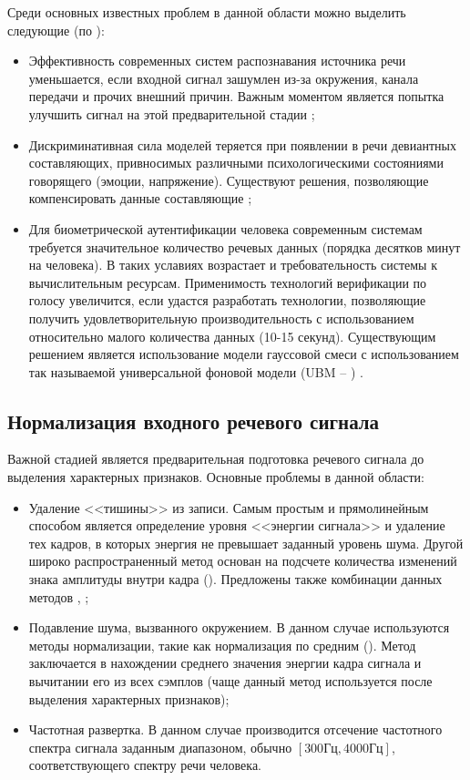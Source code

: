 Среди основных известных проблем в данной области можно выделить следующие (по \cite{Jayanna09overview}):
\begin{itemize}
\item Эффективность современных систем распознавания источника речи уменьшается, если входной сигнал зашумлен из-за окружения, канала передачи и прочих внешний причин. Важным моментом является попытка улучшить сигнал на этой предварительной стадии \cite{Greenwood00suv};
\item Дискриминативная сила моделей теряется при появлении в речи девиантных составляющих, привносимых различными психологическими состояниями говорящего (эмоции, напряжение). Существуют решения, позволяющие компенсировать данные составляющие \cite{Alamo96discriminative};
\item Для биометрической аутентификации человека современным системам требуется значительное количество речевых данных (порядка десятков минут на человека). В таких уславиях возрастает и требовательность системы к вычислительным ресурсам. Применимость технологий верификации по голосу увеличится, если удастся разработать технологии, позволяющие получить удовлетворительную производительность с использованием относительно малого количества данных (10-15 секунд). Существующим решением является использование модели гауссовой смеси с использованием так называемой универсальной фоновой модели (UBM -- ) \cite{Reynolds00speakerverification}.
\end{itemize}

\subsection{Нормализация входного речевого сигнала}

Важной стадией является предварительная подготовка речевого сигнала до выделения характерных признаков. Основные проблемы в данной области:

\begin{itemize}
\item Удаление <<тишины>> из записи. Самым простым и прямолинейным способом является определение уровня <<энергии сигнала>> и удаление тех кадров, в которых энергия не превышает заданный уровень шума. Другой широко распространенный метод основан на подсчете количества изменений знака амплитуды внутри кадра (). Предложены также комбинации данных методов \cite{Greenwood00suv}, \cite{Bachu04zcr};
\item Подавление шума, вызванного окружением. В данном случае используются методы нормализации, такие как нормализация по средним (). Метод заключается в нахождении среднего значения энергии кадра сигнала и вычитании его из всех сэмплов (чаще данный метод используется после выделения характерных признаков);
\item Частотная развертка. В данном случае производится отсечение частотного спектра сигнала заданным диапазоном, обычно $[300\textrm{Гц}, 4000\textrm{Гц}]$, соответствующего спектру речи человека.
\end{itemize}

